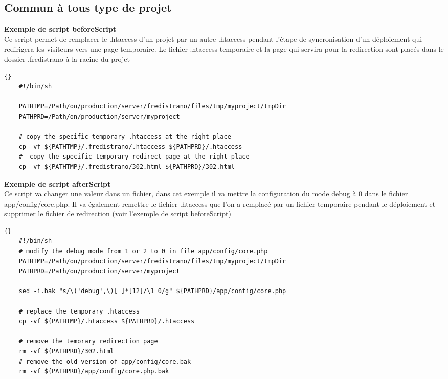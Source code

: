 \documentclass[12pt,a4paper]{report}
\begin{document}
\subsection{Commun à tous type de projet} %
\begin{list}{-}{}
\item \textbf{Exemple de script beforeScript}\\
Ce script permet de remplacer le .htaccess d'un projet par un autre .htaccess pendant l'étape de syncronisation d'un déploiement qui redirigera les visiteurs vers une page temporaire. Le fichier .htaccess temporaire et la page qui servira pour la redirection sont placés dans le dossier .fredistrano à la racine du projet

	\lstset{language=bash}
	\lstset{breaklines=true}
	\lstset{tabsize=1}
	\begin{lstlisting}[frame=tb]{}
	#!/bin/sh

	PATHTMP=/Path/on/production/server/fredistrano/files/tmp/myproject/tmpDir
	PATHPRD=/Path/on/production/server/myproject

	# copy the specific temporary .htaccess at the right place 
	cp -vf ${PATHTMP}/.fredistrano/.htaccess ${PATHPRD}/.htaccess
	#  copy the specific temporary redirect page at the right place 
	cp -vf ${PATHTMP}/.fredistrano/302.html ${PATHPRD}/302.html
	\end{lstlisting}

\item \textbf{Exemple de script afterScript}\\
Ce script va changer une valeur dans un fichier, dans cet exemple il va mettre la configuration du mode debug à 0 dans le fichier app/config/core.php. Il va également remettre le fichier .htaccess que l'on a remplacé par un fichier temporaire pendant le déploiement et supprimer le fichier de redirection (voir l'exemple de script beforeScript) 
	\lstset{language=bash}
	\lstset{breaklines=true}
	\lstset{tabsize=1}
	\begin{lstlisting}[frame=tb]{}
	#!/bin/sh
	# modify the debug mode from 1 or 2 to 0 in file app/config/core.php
	PATHTMP=/Path/on/production/server/fredistrano/files/tmp/myproject/tmpDir
	PATHPRD=/Path/on/production/server/myproject

	sed -i.bak "s/\('debug',\)[ ]*[12]/\1 0/g" ${PATHPRD}/app/config/core.php

	# replace the temporary .htaccess 
	cp -vf ${PATHTMP}/.htaccess ${PATHPRD}/.htaccess

	# remove the temorary redirection page 
	rm -vf ${PATHPRD}/302.html
	# remove the old version of app/config/core.bak
	rm -vf ${PATHPRD}/app/config/core.php.bak
	\end{lstlisting}


\end{list}
\end{document}
